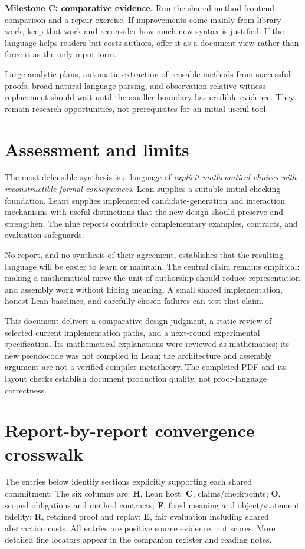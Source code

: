 \documentclass[11pt,letterpaper]{article}
\begin{document}
\textbf{Milestone C: comparative evidence.} Run the shared-method frontend comparison
and a repair exercise. If improvements come mainly from library work, keep that
work and reconsider how much new syntax is justified. If the language helps
readers but costs authors, offer it as a document view rather than force it as
the only input form.

Large analytic plans, automatic extraction of reusable methods from successful
proofs, broad natural-language parsing, and observation-relative witness
replacement should wait until the smaller boundary has credible evidence.
They remain research opportunities, not prerequisites for an initial useful tool.

\section{Assessment and limits}
The most defensible synthesis is a language of \emph{explicit mathematical choices
with reconstructible formal consequences}. Lean supplies a suitable initial
checking foundation. Leant supplies implemented candidate-generation and
interaction mechanisms with useful distinctions that the new design should
preserve and strengthen. The nine reports contribute complementary examples,
contracts, and evaluation safeguards.

No report, and no synthesis of their agreement, establishes that the resulting
language will be easier to learn or maintain. The central claim remains empirical:
making a mathematical move the unit of authorship should reduce representation
and assembly work without hiding meaning. A small shared implementation, honest
Lean baselines, and carefully chosen failures can test that claim.

This document delivers a comparative design judgment, a static review of selected
current implementation paths, and a next-round experimental specification. Its
mathematical explanations were reviewed as mathematics; its new pseudocode was
not compiled in Lean; the architecture and assembly argument are not a verified
compiler metatheory. The completed PDF and its layout checks establish document
production quality, not proof-language correctness.

\appendix
\section{Report-by-report convergence crosswalk}\label{app:convergence}
The entries below identify sections explicitly supporting each shared commitment.
The six columns are: \textbf{H}, Lean host; \textbf{C}, claims/checkpoints;
\textbf{O}, scoped obligations and method contracts; \textbf{F}, fixed meaning
and object/statement fidelity; \textbf{R}, retained proof and replay;
\textbf{E}, fair evaluation including shared abstraction costs. All entries are
positive source evidence, not scores. More detailed line locators appear in
the companion register and reading notes.
\end{document}
